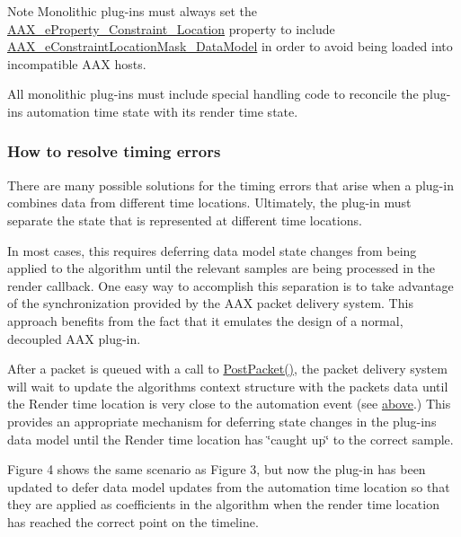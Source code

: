 \begin{DoxyNote}{Note}
Monolithic plug-\/ins must always set the \mbox{\hyperlink{a00662_a13e384f22825afd3db6d68395b79ce0da79a0815fea6c8f1a0d8ed511aa88e9ff}{A\+A\+X\+\_\+e\+Property\+\_\+\+Constraint\+\_\+\+Location}} property to include \mbox{\hyperlink{a00491_a0c5d795c1fd021c5b9b541febc34601aa027df08c137702400a92719828bea44b}{A\+A\+X\+\_\+e\+Constraint\+Location\+Mask\+\_\+\+Data\+Model}} in order to avoid being loaded into incompatible A\+AX hosts.
\end{DoxyNote}
All monolithic plug-\/ins must include special handling code to reconcile the plug-\/in\textquotesingle{}s automation time state with its render time state.\hypertarget{a00821_parameterUpdateTiming_resolvingOffsets}{}\subsubsection{How to resolve timing errors}\label{a00821_parameterUpdateTiming_resolvingOffsets}
There are many possible solutions for the timing errors that arise when a plug-\/in combines data from different time locations. Ultimately, the plug-\/in must separate the state that is represented at different time locations.

In most cases, this requires deferring data model state changes from being applied to the algorithm until the relevant samples are being processed in the render callback. One easy way to accomplish this separation is to take advantage of the synchronization provided by the A\+AX packet delivery system. This approach benefits from the fact that it emulates the design of a normal, decoupled A\+AX plug-\/in.

After a packet is queued with a call to \mbox{\hyperlink{a01789_ae5dd2b5925dbc181513bca1c4ac5e716}{Post\+Packet()}}, the packet delivery system will wait to update the algorithm\textquotesingle{}s context structure with the packet\textquotesingle{}s data until the Render time location is very close to the automation event (see \mbox{\hyperlink{a00821_parameterUpdateTiming_packet_delivery}{above}}.) This provides an appropriate mechanism for deferring state changes in the plug-\/in\textquotesingle{}s data model until the Render time location has \char`\"{}caught up\char`\"{} to the correct sample.

Figure 4 shows the same scenario as Figure 3, but now the plug-\/in has been updated to defer data model updates from the automation time location so that they are applied as coefficients in the algorithm when the render time location has reached the correct point on the timeline.

